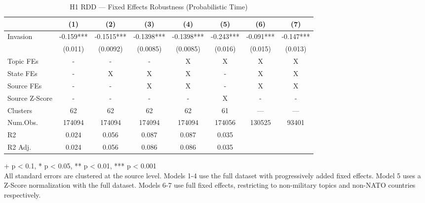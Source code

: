 \begin{table}[t]
\caption{\label{tab:table-s01}H1 RDD — Fixed Effects Robustness (Probabilistic Time)}
\fontsize{12.0pt}{14.0pt}\selectfont
\begin{tabular*}{\linewidth}{@{\extracolsep{\fill}}lccccccc}
\toprule
  & (1) & (2) & (3) & (4) & (5) & (6) & (7) \\ 
\midrule\addlinespace[2.5pt]
Invasion & -0.159*** & -0.1515*** & -0.1398*** & -0.1398*** & -0.243*** & -0.091*** & -0.147*** \\ 
{} & {(0.011)} & {(0.0092)} & {(0.0085)} & {(0.0085)} & {(0.016)} & {(0.015)} & {(0.013)} \\ 
Topic FEs & - & - & - & X & X & X & X \\ 
State FEs & - & X & X & X & - & X & X \\ 
Source FEs & - & - & X & X & - & X & X \\ 
Source Z-Score & - & - & - & - & X & - & - \\ 
Clusters & 62 & 62 & 62 & 62 & 61 & — & — \\ 
Num.Obs. & 174094 & 174094 & 174094 & 174094 & 174056 & 130525 & 93401 \\ 
R2 & 0.024 & 0.056 & 0.087 & 0.087 & 0.035 &  &  \\ 
R2 Adj. & 0.024 & 0.056 & 0.086 & 0.086 & 0.035 &  &  \\ 
\bottomrule
\end{tabular*}
\begin{minipage}{\linewidth}
\vspace{.05em}
+ p < 0.1, * p < 0.05, ** p < 0.01, *** p < 0.001\\
All standard errors are clustered at the source level. Models 1-4 use the
full dataset with progressively added fixed effects. Model 5 uses a Z-Score
normalization with the full dataset. Models 6-7 use full fixed effects,
restricting to non-military topics and non-NATO countries respectively.\\
\end{minipage}
\end{table}

